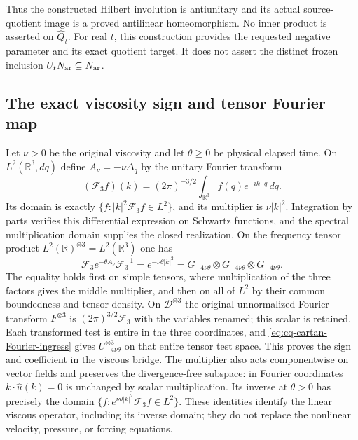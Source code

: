 Thus the constructed Hilbert involution is antiunitary and its
actual source-quotient image is a proved antilinear homeomorphism.
No inner product is asserted on $\widehat Q_t$.
For real $t$, this construction provides the requested negative
parameter and its exact quotient target. It does not assert
the distinct frozen inclusion $U_tN_{\rm ar}\subseteq N_{\rm ar}$.

\subsection{The exact viscosity sign and tensor Fourier map}

Let $\nu>0$ be the original viscosity and let $\theta\geq0$ be
physical elapsed time. On $L^2(\mathbb R^3,dq)$ define
$A_\nu=-\nu\Delta_q$ by the unitary Fourier transform
\[
 (\mathcal F_3f)(k)=(2\pi)^{-3/2}
                   \int_{\mathbb R^3}f(q)e^{-ik\cdot q}\,dq .
\]
Its domain is exactly
$\{f:|k|^2\mathcal F_3f\in L^2\}$, and its multiplier is
$\nu|k|^2$. Integration by parts verifies this differential
expression on Schwartz functions, and the spectral multiplication
domain supplies the closed realization. On the frequency tensor
product $L^2(\mathbb R)^{\otimes3}=L^2(\mathbb R^3)$ one has
\begin{equation}
 \mathcal F_3 e^{-\theta A_\nu}\mathcal F_3^{-1}
 =e^{-\nu\theta|k|^2}
 =G_{-4\nu\theta}\otimes G_{-4\nu\theta}\otimes G_{-4\nu\theta}.
 \label{eq:cq-viscosity-Fourier-intertwiner}
\end{equation}
The equality holds first on simple tensors, where multiplication
of the three factors gives the middle multiplier, and then on
all of $L^2$ by their common boundedness and tensor density.
On $\mathscr D^{\otimes3}$ the original unnormalized Fourier
transform $F^{\otimes3}$ is $(2\pi)^{3/2}\mathcal F_3$ with
the variables renamed; this scalar is retained. Each transformed
test is entire in the three coordinates, and
\eqref{eq:cq-cartan-Fourier-ingress} gives
$U_{-4\nu\theta}^{\otimes3}$ on that entire tensor test space.
This proves the sign and coefficient in the viscous bridge.
The multiplier also acts componentwise on vector fields and
preserves the divergence-free subspace: in Fourier coordinates
$k\cdot\widehat u(k)=0$ is unchanged by scalar multiplication.
Its inverse at $\theta>0$ has precisely the domain
$\{f:e^{\nu\theta|k|^2}\mathcal F_3f\in L^2\}$.
These identities identify the linear viscous operator, including
its inverse domain; they do not replace the nonlinear velocity,
pressure, or forcing equations.

